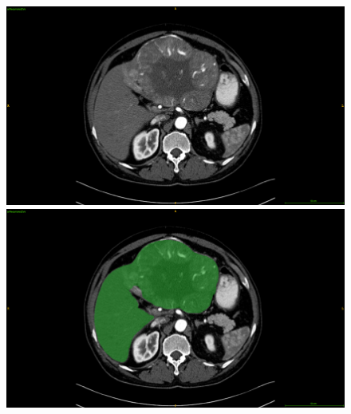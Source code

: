 \begin{figure}[ht!]
\centering
\begin{minipage}{0.45\linewidth}
\includegraphics[width=0.9\linewidth]{../HistologicalGradePrediction/images/ResizeTCIA_CECTLiver_prediction_TCGA-DD-A11A_slice42_AR_raw}
\end{minipage}
\hspace{0.3cm}
\begin{minipage}{0.45\linewidth}
\includegraphics[width=0.9\linewidth]{../HistologicalGradePrediction/images/ResizeTCIA_CECTLiver_prediction_TCGA-DD-A11A_slice42_AR_green_liver}
\end{minipage}


\end{figure}
